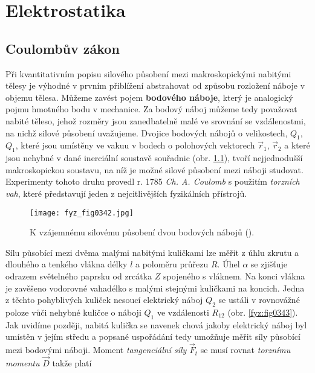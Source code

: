 \graphicspath{{../src/FYZ/img/}}
\setchaptertoc
\chapter{Elektrostatika}\label{fyz:IIIchapI}   
  \section{Coulombův zákon}\label{fyz:IIIchapIsecII}
    Při kvantitativním popisu silového působení mezi makroskopickými nabitými tělesy je výhodné v
    prvním přiblížení abstrahovat od způsobu rozložení náboje v objemu tělesa. Můžeme zavést pojem
    \textbf{bodového náboje}, který je analogický pojmu hmotného bodu v mechanice. Za bodový náboj
    můžeme tedy považovat nabité těleso, jehož rozměry jsou zanedbatelně malé ve srovnání se
    vzdálenostmi, na nichž silové působení uvažujeme. Dvojice bodových nábojů o velikostech,
    \(Q_1\), \(Q_1\), které jsou umístěny ve vakuu v bodech o polohových vektorech \(\vec{r}_1\),
    \(\vec{r}_2\) a které jsou nehybné v dané inerciální soustavě souřadnic (obr. \ref{fyz:fig0342}),
    tvoří nejjednodušší makroskopickou soustavu, na níž je možné silové působení mezi náboji
    studovat. Experimenty tohoto druhu provedl r. 1785 \emph{Ch. A. Coulomb} s použitím
    \emph{torzních vah}, které představují jeden z nejcitlivějších fyzikálních přístrojů. 

    \begin{figure}[ht!]  %
      \centering
      \texttt{[image: fyz\_fig0342.jpg]}
      \caption{K vzájemnému silovému působení dvou bodových nábojů (\cite[s.~294]{Feynman02}).}
      \label{fyz:fig0342}
    \end{figure}

    Sílu působící mezi dvěma malými nabitými kuličkami lze měřit z úhlu zkrutu a dlouhého a tenkého
    vlákna délky \(l\) a poloměru průřezu \(R\). Úhel \(\alpha\) se zjišťuje odrazem světelného
    paprsku od zrcátka \(Z\) spojeného s vláknem. Na konci vlákna je zavěšeno vodorovné vahadélko s
    malými stejnými kuličkami na koncich. Jedna z těchto pohyblivých kuliček nesoucí elektrický
    náboj \(Q_2\) se ustáli v rovnovážné poloze vůči nehybné kuličce o náboji \(Q_1\) ve vzdálenosti
    \(R_{12}\) (obr. \ref{fyz:fig0343}). Jak uvidíme později, nabitá kulička se navenek chová jakoby
    elektrický náboj byl umístěn v jejím středu a popsané uspořádání tedy umožňuje měřit síly
    působící mezi bodovými náboji. Moment \emph{tangenciální síly} \(\vec{F}_t\) se musí rovnat
    \emph{torznímu momentu} \(\vec{D}\) takže platí

